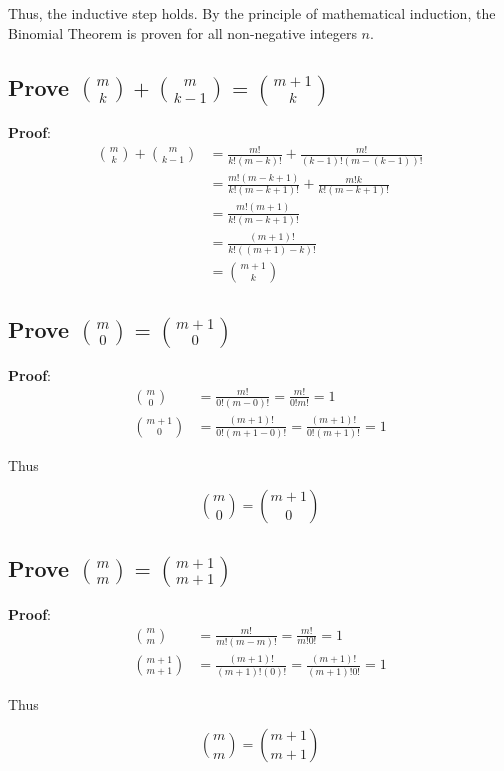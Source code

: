 \documentclass[12pt, letterpaper, oneside]{article}
\begin{document}
Thus, the inductive step holds. By the principle of mathematical induction, the Binomial Theorem is proven for all
non-negative integers \(n\).

\subsection{Prove $\binom{m}{k} + \binom{m}{k-1} = \binom{m+1}{k}$}

\textbf{Proof}:
\begin{equation*}
  \begin{split}
    \binom{m}{k} + \binom{m}{k-1}
    & = \frac{m!}{k!(m-k)!} + \frac{m!}{(k-1)!(m-(k-1))!} \\
    & = \frac{m! (m - k + 1)}{k!(m-k+1)!} + \frac{m! k}{k!(m-k+1)!} \\
    & = \frac{m! (m + 1)}{k!(m-k+1)!} \\
    & = \frac{(m + 1)!}{k!((m + 1) - k)!} \\
    & = \binom{m+1}{k}
  \end{split}
\end{equation*}

\subsection{Prove $\binom{m}{0} = \binom{m+1}{0}$}

\textbf{Proof}:
\begin{equation*}
  \begin{split}
    \binom{m}{0} & = \frac{m!}{0!(m-0)!} = \frac{m!}{0! m!} = 1 \\
    \binom{m+1}{0} & = \frac{(m+1)!}{0!(m+1-0)!} = \frac{(m+1)!}{0! (m+1)!} = 1
  \end{split}
\end{equation*}

Thus

\[\binom{m}{0} = \binom{m+1}{0}\]

\subsection{Prove $\binom{m}{m} = \binom{m+1}{m+1}$}

\textbf{Proof}:
\begin{equation*}
  \begin{split}
    \binom{m}{m} & = \frac{m!}{m!(m-m)!} = \frac{m!}{m! 0!} = 1 \\
    \binom{m+1}{m+1} & = \frac{(m+1)!}{(m+1)!(0)!} = \frac{(m+1)!}{(m+1)! 0!} = 1
  \end{split}
\end{equation*}

Thus

\[\binom{m}{m} = \binom{m+1}{m+1}\]
\end{document}
